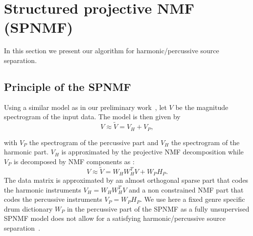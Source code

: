 \documentclass{article}
\begin{document}
\section{Structured projective NMF (SPNMF)}
\label{sec:SPNMF}

In this section we present our algorithm for harmonic/percussive source separation.


\subsection{Principle of the SPNMF}



Using a similar model as in our preliminary work~\cite{laroche2015structured}, let $V$ be the magnitude spectrogram of the input data. The model is then given by
\begin{equation} \label{Cfunction}
V \approx \tilde{V}= V_H + V_{P},
\end{equation}

with $V_P$ the spectrogram of the percussive part and $V_H$ the spectrogram of the harmonic part. $V_H$ is approximated by the projective NMF decomposition \cite{yuanOja2005} while $V_P$ is decomposed by NMF components as :
\begin{equation}
V \approx \tilde{V}= W_{H}W_{H}^{T}V + W_{P} H_{P}.
\end{equation}
The data matrix is approximated by an almost orthogonal sparse part that codes the harmonic instruments $V_H = W_HW_H^T V$ and a non constrained NMF part that codes the percussive instruments $V_P = W_PH_P$. We use here a fixed genre specific drum dictionary $W_P$ in the percussive part of the SPNMF as a fully unsupervised SPNMF model does not allow for a satisfying harmonic/percussive source separation~\cite{laroche2015structured}.
\end{document}
